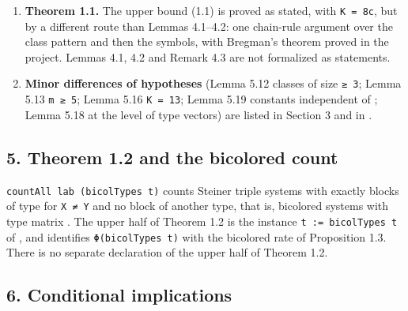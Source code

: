 \documentclass[english,11pt,a4paper]{article}
\begin{document}
\begin{enumerate}
\item
  \textbf{Theorem 1.1.} The upper bound (1.1) is proved as stated, with \texttt{K\ =\ 8c}, but by a different route than Lemmas 4.1--4.2: one chain-rule argument over the class pattern and then the symbols, with Bregman's theorem proved in the project. Lemmas 4.1, 4.2 and Remark 4.3 are not formalized as statements.
\item
  \textbf{Minor differences of hypotheses} (Lemma 5.12 classes of size \texttt{≥\ 3}; Lemma 5.13 \texttt{m\ ≥\ 5}; Lemma 5.16 \texttt{K\ =\ 13}; Lemma 5.19 constants independent of ; Lemma 5.18 at the level of type vectors) are listed in Section 3 and in .
\end{enumerate}

\subsection{5. Theorem 1.2 and the bicolored count}\label{theorem-1.2-and-the-bicolored-count}

\texttt{countAll\ lab\ (bicolTypes\ t)} counts Steiner triple systems with exactly  blocks of type  for \texttt{X\ ≠\ Y} and no block of another type, that is, bicolored systems with type matrix . The upper half of Theorem 1.2 is the instance \texttt{t\ :=\ bicolTypes\ t} of , and  identifies \texttt{Φ(bicolTypes\ t)} with the bicolored rate of Proposition 1.3. There is no separate declaration of the upper half of Theorem 1.2.

\subsection{6. Conditional implications}\label{conditional-implications}
\end{document}
